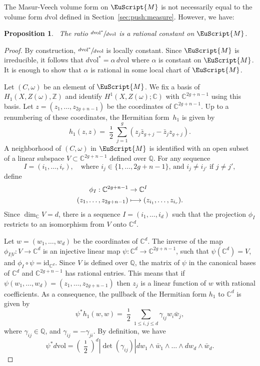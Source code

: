\documentclass[JEP,XML,SOM,Unicode]{cedram}
\let\mathcal\EuScript
\newcommand\mto{\mathchoice{\longmapsto}{\mapsto}{\mapsto}{\mapsto}}
\theoremstyle{plain}
\newtheorem{Proposition}[Theorem]{Proposition}
\theoremstyle{definition}
\def\C{\mathbb{C}}
\newcommand\Z{\mathbb{Z}}
\newcommand{\Q}{\mathbb{Q}}
\newcommand{\cM}{\mathcal{M}}
\newcommand{\id}{\mathrm{id}}
\newcommand{\vol}{\mathrm{vol}}
\begin{document}
The Masur-Veech volume form on $\cM$ is not necessarily equal to the volume form $d\vol$ defined in Section~\ref{sec:push:measure}. However, we have:

\begin{Proposition}~\label{prop:compare:meas:arith}
The ratio $\sfrac{d\vol^*}{d\vol}$ is a rational constant on $\cM$.
\end{Proposition}

\begin{proof}
By construction, $\sfrac{d\vol^*}{d\vol}$ is locally constant. Since $\cM$ is irreducible, it follows that $d\vol^*=\alpha\, d\vol$ where $\alpha$ is constant on $\cM$. It is enough to show that $\alpha$ is rational in some local chart of $\cM$.

Let $(C,\omega)$ be an element of $\cM$. We fix a basis of $H_1(X,Z(\omega),\Z)$ and identify $H^1(X,Z(\omega);\C)$ with $\C^{2g+n-1}$ using this basis.
Let $z=(z_1,\dots, z_{2g+n-1})$ be the coordinates of $\C^{2g+n-1}$.
Up to a renumbering of these coordinates, the Hermitian form~$h_1$ is given by
\[
h_1(z,z)=\frac{\imath}{2}\sum_{j=1}^g(z_j\bar{z}_{g+j}-\bar{z}_jz_{g+j}).
\]
A neighborhood of $(C,\omega)$ in $\cM$ is identified with an open subset of a linear subspace $V\subset \C^{2g+n-1}$ defined over $\Q$.
For any sequence
\[
I=(i_1,\dots,i_r),\quad\text{where $i_j\in \{1,\dots,2g+n-1\}$, and $i_j\neq i_{j'}$ if $j\neq j'$},
\]
define
\begin{align*}
\phi_I: \C^{2g+n-1} & \to \C^{I}\\
(z_1,\dots,z_{2g+n-1}) & \mto (z_{i_1},\dots,z_{i_r}).
\end{align*}
Since $\dim_\C V=d$, there is a sequence $I=(i_1,\dots,i_d)$ such that the projection $\phi_I$ restricts to an isomorphism from $V$ onto $\C^{d}$.

Let $w=(w_1,\dots,w_d)$ be the coordinates of $\C^d$. The inverse of the map \hbox{$\phi_{I|V}: V \to \C^d$} is an injective linear map $\psi: \C^d \to \C^{2g+n-1}$, such that $\psi(\C^d)=V$, and $\phi_I\circ\psi =\id_{\C^d}$. Since $V$ is defined over $\Q$, the matrix of $\psi$ in the canonical bases of $\C^d$ and $\C^{2g+n-1}$ has rational entries. This means that if $\psi(w_1,\dots,w_d)=(z_1,\dots,z_{2g+n-1})$ then $z_j$ is a linear function of $w$ with rational coefficients.
As a consequence, the pullback of the Hermitian form $h_1$ to $\C^{d}$ is given by
\[
\psi^*h_1(w,w)=\frac{\imath}{2}\sum_{1\leq i,j\leq d}\gamma_{ij}w_i\bar{w}_j,
\]
where $\gamma_{ij}\in \Q$, and $\gamma_{ij}=-\gamma_{ji}$.
By definition, we have
\[
\psi^*d\vol=\left(\frac{\imath}{2}\right)^d\left|{\det}(\gamma_{ij})\right|dw_1\wedge\bar{w}_1\wedge\dots\wedge dw_d\wedge\bar{w}_d.
\]


\end{proof}
\end{document}
